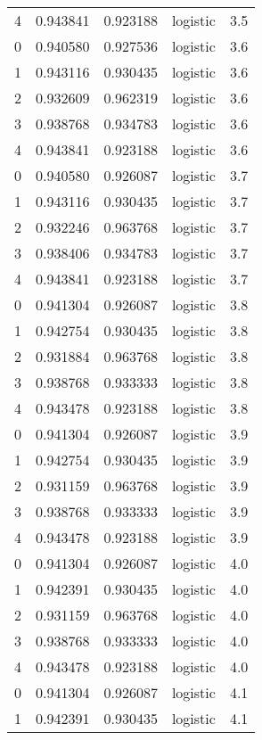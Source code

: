 \begin{tabular}{rrrlr}
     4 & 0.943841 & 0.923188 & logistic &        3.5 \\
     0 & 0.940580 & 0.927536 & logistic &        3.6 \\
     1 & 0.943116 & 0.930435 & logistic &        3.6 \\
     2 & 0.932609 & 0.962319 & logistic &        3.6 \\
     3 & 0.938768 & 0.934783 & logistic &        3.6 \\
     4 & 0.943841 & 0.923188 & logistic &        3.6 \\
     0 & 0.940580 & 0.926087 & logistic &        3.7 \\
     1 & 0.943116 & 0.930435 & logistic &        3.7 \\
     2 & 0.932246 & 0.963768 & logistic &        3.7 \\
     3 & 0.938406 & 0.934783 & logistic &        3.7 \\
     4 & 0.943841 & 0.923188 & logistic &        3.7 \\
     0 & 0.941304 & 0.926087 & logistic &        3.8 \\
     1 & 0.942754 & 0.930435 & logistic &        3.8 \\
     2 & 0.931884 & 0.963768 & logistic &        3.8 \\
     3 & 0.938768 & 0.933333 & logistic &        3.8 \\
     4 & 0.943478 & 0.923188 & logistic &        3.8 \\
     0 & 0.941304 & 0.926087 & logistic &        3.9 \\
     1 & 0.942754 & 0.930435 & logistic &        3.9 \\
     2 & 0.931159 & 0.963768 & logistic &        3.9 \\
     3 & 0.938768 & 0.933333 & logistic &        3.9 \\
     4 & 0.943478 & 0.923188 & logistic &        3.9 \\
     0 & 0.941304 & 0.926087 & logistic &        4.0 \\
     1 & 0.942391 & 0.930435 & logistic &        4.0 \\
     2 & 0.931159 & 0.963768 & logistic &        4.0 \\
     3 & 0.938768 & 0.933333 & logistic &        4.0 \\
     4 & 0.943478 & 0.923188 & logistic &        4.0 \\
     0 & 0.941304 & 0.926087 & logistic &        4.1 \\
     1 & 0.942391 & 0.930435 & logistic &        4.1 \\

\end{tabular}
